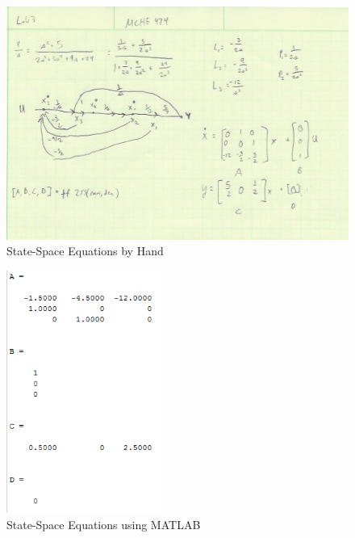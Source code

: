\documentclass[12pt]{article}
\begin{document}
\begin{figure}[htbp] %
   \centering
   \includegraphics[width=\linewidth]{handwritten_calculations.jpeg} 
   \caption{State-Space Equations by Hand}
   \label{fig:example}
\end{figure}

\newpage

\begin{figure}[h!] %
   \centering
   \includegraphics[width=2in]{coefficient_matrices.PNG} 
   \caption{State-Space Equations using MATLAB}
   \label{fig:example}
\end{figure}

\bigskip
\end{document}
